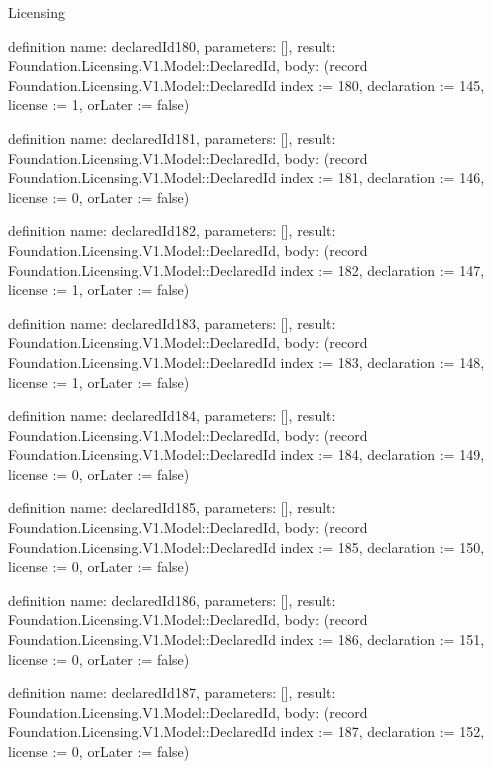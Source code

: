 \begin{lexlean}{Licensing}
\begin{semanticmodule}
definition{
  name: declaredId180,
  parameters: [],
  result: Foundation.Licensing.V1.Model::DeclaredId,
  body: (record Foundation.Licensing.V1.Model::DeclaredId {index := 180, declaration := 145, license := 1, orLater := false})
}

definition{
  name: declaredId181,
  parameters: [],
  result: Foundation.Licensing.V1.Model::DeclaredId,
  body: (record Foundation.Licensing.V1.Model::DeclaredId {index := 181, declaration := 146, license := 0, orLater := false})
}

definition{
  name: declaredId182,
  parameters: [],
  result: Foundation.Licensing.V1.Model::DeclaredId,
  body: (record Foundation.Licensing.V1.Model::DeclaredId {index := 182, declaration := 147, license := 1, orLater := false})
}

definition{
  name: declaredId183,
  parameters: [],
  result: Foundation.Licensing.V1.Model::DeclaredId,
  body: (record Foundation.Licensing.V1.Model::DeclaredId {index := 183, declaration := 148, license := 1, orLater := false})
}

definition{
  name: declaredId184,
  parameters: [],
  result: Foundation.Licensing.V1.Model::DeclaredId,
  body: (record Foundation.Licensing.V1.Model::DeclaredId {index := 184, declaration := 149, license := 0, orLater := false})
}

definition{
  name: declaredId185,
  parameters: [],
  result: Foundation.Licensing.V1.Model::DeclaredId,
  body: (record Foundation.Licensing.V1.Model::DeclaredId {index := 185, declaration := 150, license := 0, orLater := false})
}

definition{
  name: declaredId186,
  parameters: [],
  result: Foundation.Licensing.V1.Model::DeclaredId,
  body: (record Foundation.Licensing.V1.Model::DeclaredId {index := 186, declaration := 151, license := 0, orLater := false})
}

definition{
  name: declaredId187,
  parameters: [],
  result: Foundation.Licensing.V1.Model::DeclaredId,
  body: (record Foundation.Licensing.V1.Model::DeclaredId {index := 187, declaration := 152, license := 0, orLater := false})
}


\end{semanticmodule}
\end{lexlean}
